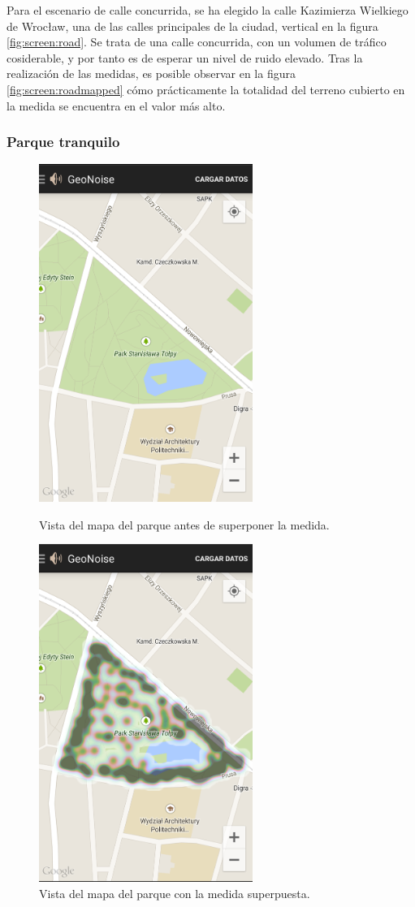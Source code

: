     Para el escenario de calle concurrida, se ha elegido la calle Kazimierza Wielkiego de Wrocław, una de las calles principales de la ciudad, vertical en la figura  \ref{fig:screen:road}. Se trata de una calle concurrida, con un volumen de tráfico cosiderable, y por tanto es de esperar un nivel de ruido elevado. Tras la realización de las medidas, es posible observar en la figura \ref{fig:screen:roadmapped} cómo prácticamente la totalidad del terreno cubierto en la medida se encuentra en el valor más alto.

\subsubsection{Parque tranquilo}
\begin{figure}[H] \centering
 \begin{minipage}{0.45\textwidth}\centering
    \includegraphics[height=11cm]{graphs/park.png} \caption{Vista del mapa del parque antes de superponer la medida.}\label{fig:screen:park}
 \end{minipage}
 \hfill
\begin{minipage}{0.45\textwidth}\centering
    \includegraphics[height=11cm]{graphs/parkmapped.png} \caption{Vista del mapa del parque con la medida superpuesta.}\label{fig:screen:parkmapped}

\end{minipage}
\end{figure}
